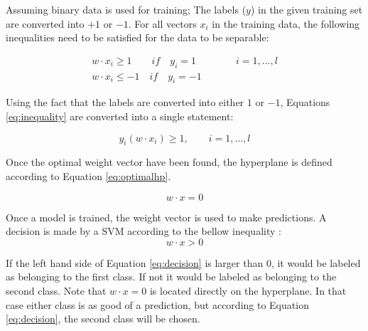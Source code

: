 \documentclass[a4paper,twoside]{bth}
\begin{document}
\par Assuming binary data is used for training; The labels ($y$) in the given training set are converted into $+1$ or $-1$. For all vectors $x_i$ in the training data, the following inequalities need to be satisfied for the data to be separable:

\begin{equation}\label{eq:inequality}
    \begin{array}{l}
    w \cdot x_i \geq 1 \quad \quad if \quad y_i = 1 \quad \quad \quad \quad i = 1,...,l \\
    w \cdot x_i \leq -1 \quad if \quad y_i = -1
    \end{array}
\end{equation}



\par Using the fact that the labels are converted into either $1$ or $-1$, Equations \ref{eq:inequality} are converted into a single statement:

\begin{equation}\label{eq:singleineq}
    y_i(w \cdot x_i) \geq 1, \quad \quad i = 1,...,l 
\end{equation}

Once the optimal weight vector have been found, the hyperplane is defined according to Equation \ref{eq:optimalhp}.

\begin{equation}\label{eq:optimalhp}
    w \cdot x = 0
\end{equation}

\par Once a model is trained, the weight vector is used to make predictions. A decision is made by a SVM according to the bellow inequality \cite{vapnik1}:
\begin{equation}\label{eq:decision}
    w \cdot x > 0
\end{equation}

If the left hand side of Equation \ref{eq:decision} is larger than $0$, it would be labeled as belonging to the first class. If not it would be labeled as belonging to the second class. Note that $w \cdot x = 0$ is located directly on the hyperplane. In that case either class is as good of a prediction, but according to Equation \ref{eq:decision}, the second class will be chosen.
\end{document}
